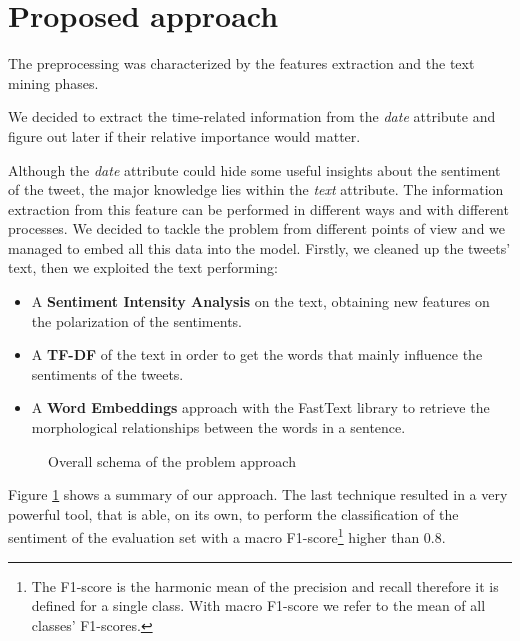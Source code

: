 \documentclass[conference]{IEEEtran}
\begin{document}
\section{Proposed approach}\label{sec:approach}
The preprocessing was characterized by the features extraction and the text mining phases.

We decided to extract the time-related information from the \textit{date} attribute and figure out later if their relative importance would matter.

Although the \textit{date} attribute could hide some useful insights about the sentiment of the tweet, the major knowledge lies within the \textit{text} attribute. The information extraction from this feature can be performed in different ways and with different processes. We decided to tackle the problem from different points of view and we managed to embed all this data into the model. Firstly, we cleaned up the tweets' text, then we exploited the text performing:
\begin{itemize}
    \item A \textbf{Sentiment Intensity Analysis}\cite{sentiment_analysis} on the text, obtaining new features on the polarization of the sentiments.
    \item A \textbf{TF-DF} %
    of the text in order to get the words that mainly influence the sentiments of the tweets.
    \item A \textbf{Word Embeddings}\cite{wordembeddings} approach with the FastText\cite{fasttext} library to retrieve the morphological relationships between the words in a sentence.
\end{itemize}
\begin{figure}[h]
        \centering
        
        \caption{Overall schema of the problem approach}
        \label{fig:overall_schema}
\end{figure}
Figure \ref{fig:overall_schema} shows a summary of our approach.
The last technique resulted in a very powerful tool, that is able, on its own, to perform the classification of the sentiment of the evaluation set with a macro F1-score\footnote{The F1-score is the harmonic mean of the precision and recall therefore it is defined for a single class. With macro F1-score we refer to the mean of all classes' F1-scores.}
higher than 0.8. 
\end{document}
